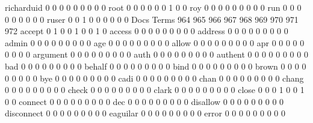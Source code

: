 \documentclass[compress,8pt]{beamer}
\begin{document}
\begin{frame}
\begin{Schunk}
  richarduid                                 0   0   0   0   0   0   0   0   0
  root                                       0   0   0   0   0   0   1   0   0
  roy                                        0   0   0   0   0   0   0   0   0
  run                                        0   0   0   0   0   0   0   0   0
  ruser                                      0   0   1   0   0   0   0   0   0
                                          Docs
Terms                                      964 965 966 967 968 969 970 971 972
  accept                                     0   1   0   0   1   0   0   1   0
  access                                     0   0   0   0   0   0   0   0   0
  address                                    0   0   0   0   0   0   0   0   0
  admin                                      0   0   0   0   0   0   0   0   0
  age                                        0   0   0   0   0   0   0   0   0
  allow                                      0   0   0   0   0   0   0   0   0
  apr                                        0   0   0   0   0   0   0   0   0
  argument                                   0   0   0   0   0   0   0   0   0
  auth                                       0   0   0   0   0   0   0   0   0
  authent                                    0   0   0   0   0   0   0   0   0
  bad                                        0   0   0   0   0   0   0   0   0
  behalf                                     0   0   0   0   0   0   0   0   0
  bind                                       0   0   0   0   0   0   0   0   0
  brown                                      0   0   0   0   0   0   0   0   0
  bye                                        0   0   0   0   0   0   0   0   0
  cadi                                       0   0   0   0   0   0   0   0   0
  chan                                       0   0   0   0   0   0   0   0   0
  chang                                      0   0   0   0   0   0   0   0   0
  check                                      0   0   0   0   0   0   0   0   0
  clark                                      0   0   0   0   0   0   0   0   0
  close                                      0   0   0   1   0   0   1   0   0
  connect                                    0   0   0   0   0   0   0   0   0
  dec                                        0   0   0   0   0   0   0   0   0
  disallow                                   0   0   0   0   0   0   0   0   0
  disconnect                                 0   0   0   0   0   0   0   0   0
  eaguilar                                   0   0   0   0   0   0   0   0   0
  error                                      0   0   0   0   0   0   0   0   0

\end{Schunk}
\end{frame}
\end{document}
